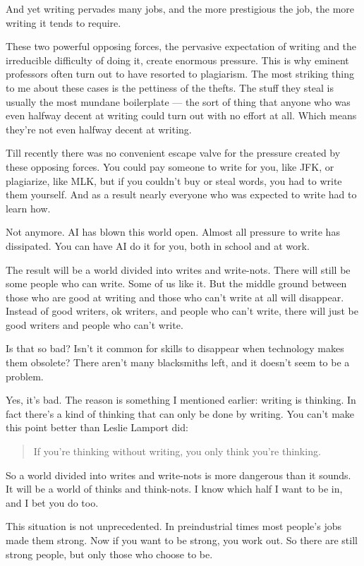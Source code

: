 \documentclass[12pt]{book}
\begin{document}
And yet writing pervades many jobs, and the more prestigious the job,
the more writing it tends to require.

These two powerful opposing forces, the pervasive expectation of writing
and the irreducible difficulty of doing it, create enormous pressure.
This is why eminent professors often turn out to have resorted to
plagiarism. The most striking thing to me about these cases is the
pettiness of the thefts. The stuff they steal is usually the most
mundane boilerplate --- the sort of thing that anyone who was even
halfway decent at writing could turn out with no effort at all. Which
means they're not even halfway decent at writing.

Till recently there was no convenient escape valve for the pressure
created by these opposing forces. You could pay someone to write for
you, like JFK, or plagiarize, like MLK, but if you couldn't buy or steal
words, you had to write them yourself. And as a result nearly everyone
who was expected to write had to learn how.

Not anymore. AI has blown this world open. Almost all pressure to write
has dissipated. You can have AI do it for you, both in school and at
work.

The result will be a world divided into writes and write-nots. There
will still be some people who can write. Some of us like it. But the
middle ground between those who are good at writing and those who can't
write at all will disappear. Instead of good writers, ok writers, and
people who can't write, there will just be good writers and people who
can't write.

Is that so bad? Isn't it common for skills to disappear when technology
makes them obsolete? There aren't many blacksmiths left, and it doesn't
seem to be a problem.

Yes, it's bad. The reason is something I mentioned earlier: writing is
thinking. In fact there's a kind of thinking that can only be done by
writing. You can't make this point better than Leslie Lamport did:

\begin{quote}
If you're thinking without writing, you only think you're thinking.
\end{quote}

So a world divided into writes and write-nots is more dangerous than it
sounds. It will be a world of thinks and think-nots. I know which half I
want to be in, and I bet you do too.

This situation is not unprecedented. In preindustrial times most
people's jobs made them strong. Now if you want to be strong, you work
out. So there are still strong people, but only those who choose to be.
\end{document}
